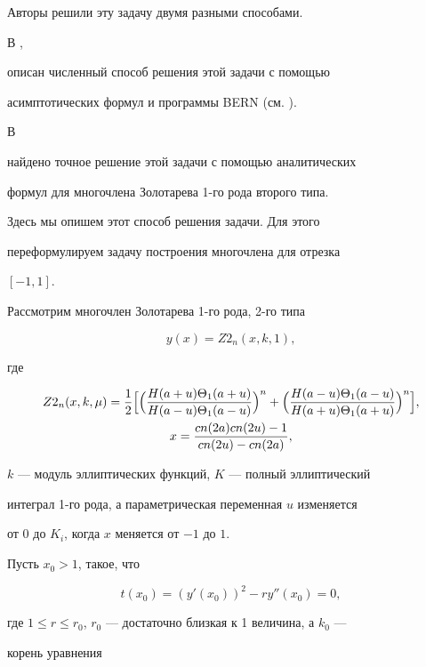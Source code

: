Авторы решили эту задачу двумя разными способами.


В \cite{6}, \cite{9}


описан численный способ решения этой задачи с помощью


асимптотических формул и программы BERN (см. \cite{9}).


В \cite{7}


найдено точное решение этой задачи с помощью аналитических


формул для многочлена Золотарева 1-го рода второго типа.


Здесь мы опишем этот способ решения задачи. Для этого


переформулируем задачу построения многочлена для отрезка


$[-1,1]$.


Рассмотрим многочлен Золотарева 1-го рода, 2-го типа \cite{7}


$$


y(x)=Z2_n(x,k,1),


$$


где


\begin{gather*}


Z2_n (x,k,\mu)=\frac{1}{2}\Bigl[\Bigl(\frac{H(a+u) \Theta_1(a+u)}


{H(a-u) \Theta_1(a-u)}\Bigr)^n+


\Bigl(\frac{H(a-u) \Theta_1(a-u)}{H(a+u) \Theta_1(a+u)}\Bigr)^n\Bigr], \\


x=\frac{cn (2a) cn (2u)-1}{cn(2u)-cn(2a)},


\end{gather*}


$k$ --- модуль эллиптических функций, $K$ --- полный эллиптический


интеграл 1-го рода, а параметрическая переменная $u$ изменяется


от 0 до $K_i$, когда $x$ меняется от $-1$ до $1$.


Пусть $x_0>1$, такое, что


\begin{equation}


t(x_0)=(y'(x_0))^2-ry''(x_0)=0,


\label{37}


\end{equation}


где $1\le r\le r_0$, $r_0$ --- достаточно близкая к 1 величина, а $k_0$ ---


корень уравнения


